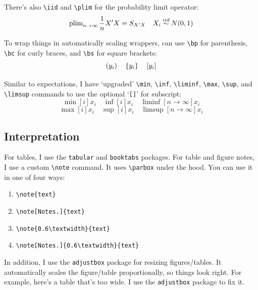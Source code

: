 \documentclass[12pt]{article}
\begin{document}
There's also \texttt{\textbackslash iid} and \texttt{\textbackslash plim} for the probability limit operator:
$$\operatorname{plim}_{n\to \infty} \frac{1}{n} X' X = S_{X'X} \quad X_i \mathbin{\overset{iid}{\sim}} N(0, 1)$$

To wrap things in automatically scaling wrappers, can use \texttt{\textbackslash bp} for parenthesis, \texttt{\textbackslash bc} for curly braces, and \texttt{\textbackslash bs} for square brackets:
$$\left( y_i \right) \quad \left\lbrace y_i \right\rbrace \quad \left[ y_i \right]$$

Similar to expectations, I have `upgraded' \texttt{\textbackslash min}, \texttt{\textbackslash inf}, \texttt{\textbackslash liminf}, \texttt{\textbackslash max}, \texttt{\textbackslash sup}, and \texttt{\textbackslash limsup} commands to use the optional `\texttt{[]}' for subscript:
$$\min[i]{x_i} \quad \inf[i]{x_i} \quad \liminf[n \to \infty]{x_i}$$
$$\max[i]{x_i} \quad \sup[i]{x_i} \quad \limsup[n \to \infty]{x_i}$$


\subsection{Interpretation}

For tables, I use the \texttt{tabular} and \texttt{booktabs} packages. For table and figure notes, I use a custom \texttt{\textbackslash note} command. It uses \texttt{\textbackslash parbox} under the hood. You can use it in one of four ways:
\begin{enumerate}
  \item \texttt{\textbackslash note\{text\}}
  \item \texttt{\textbackslash note[Notes.]\{text\}}
  \item \texttt{\textbackslash note\{0.6\textbackslash textwidth\}\{text\}}
  \item \texttt{\textbackslash note[Notes.]\{0.6\textbackslash textwidth\}\{text\}}
\end{enumerate}

In addition, I use the \texttt{adjustbox} package for resizing figures/tables. It automatically scales the figure/table proportionally, so things look right. For example, here's a table that's too wide. I use the \texttt{adjustbox} package to fix it.
\end{document}
